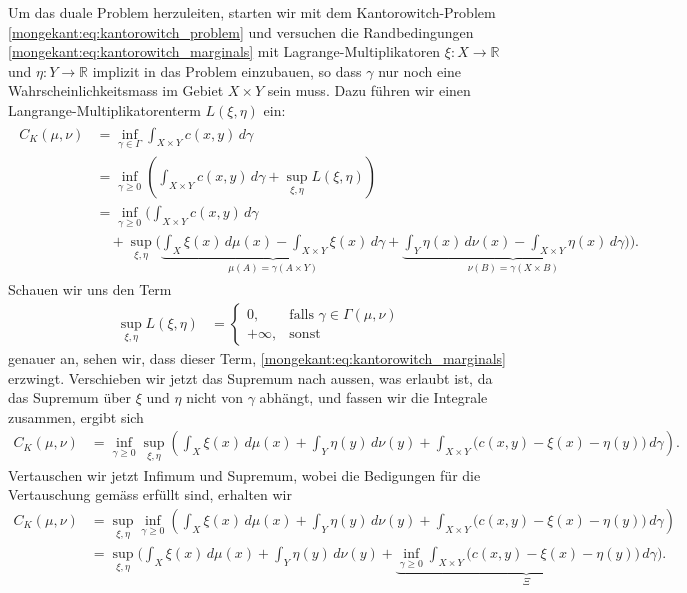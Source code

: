 Um das duale Problem herzuleiten,
%
starten wir mit dem Kantorowitch-Problem \eqref{mongekant:eq:kantorowitch_problem}
und versuchen die Randbedingungen \eqref{mongekant:eq:kantorowitch_marginals}
mit Lagrange-Multiplikatoren $\xi \colon X \to \mathbb{R}$ und
$\eta \colon Y \to \mathbb{R}$ implizit in das Problem einzubauen,
so dass $\gamma$ nur noch eine Wahrscheinlichkeitsmass im Gebiet $X\times Y$ sein muss.
Dazu führen wir einen Langrange-Multiplikatoren\-term $L(\xi,\eta)$ ein:
\begin{align*}
\begin{aligned}
C_K(\mu, \nu)
&=
\inf_{\gamma \in \Gamma} \int_{X \times Y} c(x,y)\, d\gamma
\\
&=
\inf_{\gamma \geq 0} \left(
    \int_{X \times Y} c(x,y)\, d\gamma
+ \sup_{\xi, \eta} L(\xi, \eta)
\right)
\\
&=
\inf_{\gamma \geq 0} \Biggl(
\int_{X \times Y} c(x,y)\, d\gamma
\\
&\quad
+ \sup_{\xi, \eta} \Biggl(
\underbrace{
\int_X \xi(x)\, d\mu(x) - \int_{X \times Y} \xi(x)\, d\gamma
}_{\displaystyle \mu(A) = \gamma(A \times Y)}
+ \underbrace{
\int_Y \eta(x)\, d\nu(x) - \int_{X \times Y} \eta(x)\, d\gamma
}_{\displaystyle \nu(B) = \gamma(X \times B)}
\Biggr)\Biggr)
.
\end{aligned}
\end{align*}
Schauen wir uns den Term %
\begin{align*}
\sup_{\xi, \eta} L(\xi, \eta)
&=
\begin{cases}
0,
& \text{falls } \gamma \in \Gamma(\mu, \nu) \\
+\infty,
& \text{sonst}
\end{cases}
\end{align*}
genauer an,
sehen wir,
dass dieser Term,
\eqref{mongekant:eq:kantorowitch_marginals} erzwingt.
Verschieben wir jetzt das Supremum nach aussen,
was erlaubt ist,
da das Supremum über $\xi$ und $\eta$ nicht von $\gamma$ abhängt,
und fassen wir die Integrale zusammen,
ergibt sich
\begin{align*}
C_K(\mu, \nu)
&=
\inf_{\gamma \geq 0}
\sup_{\xi, \eta}
\left(
\int_X \xi(x)\, d\mu(x)
+ \int_Y \eta(y)\, d\nu(y)
+ \int_{X \times Y} \bigl(c(x,y) - \xi(x) - \eta(y)\bigr)\, d\gamma
\right)
.
\end{align*}
Vertauschen wir jetzt Infimum und Supremum,
wobei die Bedigungen für die Vertauschung gemäss \cite{mongekant:villani} erfüllt sind,
erhalten wir
\begin{align*}
C_K(\mu, \nu)
&=
\sup_{\xi, \eta}
\inf_{\gamma \geq 0}
\left(
\int_X \xi(x)\, d\mu(x)
+ \int_Y \eta(y)\, d\nu(y)
+ \int_{X \times Y} \bigl(c(x,y) - \xi(x) - \eta(y)\bigr)\, d\gamma
\right)
\\
&=
\sup_{\xi, \eta} 
\Biggl(
\int_X \xi(x)\, d\mu(x)
+ \int_Y \eta(y)\, d\nu(y)
+ \underbrace{
\inf_{\gamma \geq 0} \int_{X \times Y} \bigl(c(x,y) - \xi(x) - \eta(y)\bigr)\, d\gamma
}_{\displaystyle\Xi}
\Biggr)
.
\end{align*}
